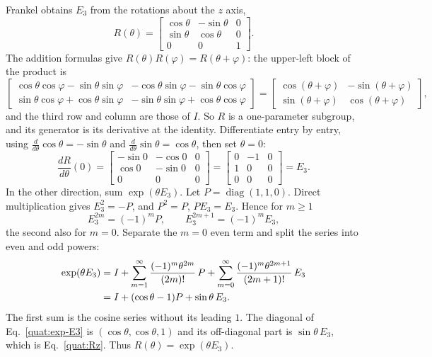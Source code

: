 Frankel obtains $E_3$ from the rotations about the $z$ axis,
\begin{equation}\label{quat:Rz}
 R(\theta)=\begin{bmatrix}\cos\theta&-\sin\theta&0\\
 \sin\theta&\cos\theta&0\\0&0&1\end{bmatrix}.
\end{equation}
The addition formulas give $R(\theta)R(\varphi)=R(\theta+\varphi)$: the
upper-left block of the product is
\begin{equation}
 \begin{bmatrix}\cos\theta\cos\varphi-\sin\theta\sin\varphi&
  -\cos\theta\sin\varphi-\sin\theta\cos\varphi\\
  \sin\theta\cos\varphi+\cos\theta\sin\varphi&
  -\sin\theta\sin\varphi+\cos\theta\cos\varphi\end{bmatrix}
 =\begin{bmatrix}\cos(\theta+\varphi)&-\sin(\theta+\varphi)\\
  \sin(\theta+\varphi)&\cos(\theta+\varphi)\end{bmatrix},
\end{equation}
and the third row and column are those of $I$. So $R$ is a one-parameter
subgroup, and its generator is its derivative at the identity. Differentiate
entry by entry, using $\frac{d}{d\theta}\cos\theta=-\sin\theta$ and
$\frac{d}{d\theta}\sin\theta=\cos\theta$, then set $\theta=0$:
\begin{equation}\label{quat:E3-derivative}
 \frac{dR}{d\theta}(0)
 =\begin{bmatrix}-\sin0&-\cos0&0\\\cos0&-\sin0&0\\0&0&0\end{bmatrix}
 =\begin{bmatrix}0&-1&0\\1&0&0\\0&0&0\end{bmatrix}=E_3 .
\end{equation}
In the other direction, sum $\exp(\theta E_3)$. Let
$P=\operatorname{diag}(1,1,0)$. Direct multiplication gives $E_3^2=-P$, and
$P^2=P$, $PE_3=E_3$. Hence for $m\ge1$
\begin{equation}
 E_3^{2m}=(-1)^mP,\qquad E_3^{2m+1}=(-1)^mE_3 ,
\end{equation}
the second also for $m=0$. Separate the $m=0$ even term and split the
series into even and odd powers:
\begin{align}
 \exp(\theta E_3)
 &=I+\sum_{m=1}^{\infty}\frac{(-1)^m\theta^{2m}}{(2m)!}\,P
   +\sum_{m=0}^{\infty}\frac{(-1)^m\theta^{2m+1}}{(2m+1)!}\,E_3\notag\\
 &=I+(\cos\theta-1)P+\sin\theta\,E_3 .\label{quat:exp-E3}
\end{align}
The first sum is the cosine series without its leading $1$. The diagonal
of Eq.~\eqref{quat:exp-E3} is $(\cos\theta,\cos\theta,1)$ and its
off-diagonal part is $\sin\theta\,E_3$, which is Eq.~\eqref{quat:Rz}.
Thus $R(\theta)=\exp(\theta E_3)$.


